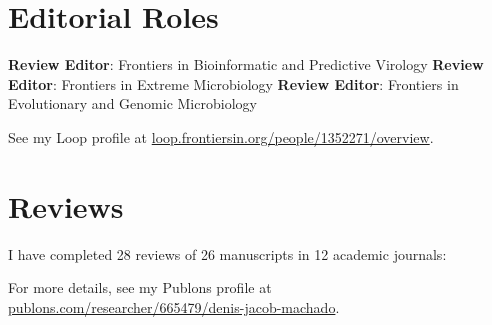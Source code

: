 
\section{Editorial Roles}

	    {\textbf{Review Editor}: Frontiers in Bioinformatic and Predictive Virology}
	\cvline{---}
	    {\textbf{Review Editor}: Frontiers in Extreme Microbiology}
	\cvline{---}
	    {\textbf{Review Editor}: Frontiers in Evolutionary and Genomic Microbiology}

\vspace{0.5em}

See my Loop profile at  \href{https://loop.frontiersin.org/people/1352271/overview}{loop.frontiersin.org/people/1352271/overview}.

\section{Reviews}
    
    I have completed 28 reviews of 26 manuscripts in 12 academic journals:
    
    \vspace{0.5em}
    


    \vspace{0.5em}

    For more details, see my Publons profile at  \href{https://publons.com/researcher/665479/denis-jacob-machado/}{publons.com/researcher/665479/denis-jacob-machado}.
